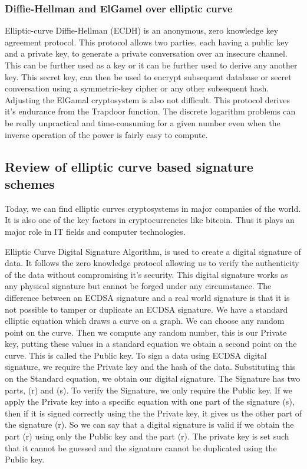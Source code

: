 \documentclass{article}
\begin{document}
\subsubsection{Diffie-Hellman and ElGamel over elliptic curve}
Elliptic-curve Diffie-Hellman (ECDH) is an anonymous, zero knowledge key agreement protocol. This protocol allows two parties, each having a public key and a private key, to generate a private conversation over an insecure channel. This can be further used as a key or it can be further used to derive any another key. This secret key, can then be used to encrypt subsequent database or secret conversation using a symmetric-key cipher or any other subsequent hash.\\
Adjusting the ElGamal cryptosystem is also not difficult. This protocol derives it's endurance from the Trapdoor function. The discrete logarithm problems can be really unpractical and time-consuming for a given number even when the inverse operation of the power is fairly easy to compute.
\subsection{Review of elliptic curve based signature schemes}
Today, we can find elliptic curves cryptosystems in major companies of the world. It is also one of the key factors in cryptocurrencies like bitcoin. Thus it plays an major role in IT fields and computer technologies. 


Elliptic Curve Digital Signature Algorithm, is used to create a digital signature of data. It follows the zero knowledge protocol allowing us to verify the authenticity of the data without compromising it's security.
 This digital signature works as any physical signature but cannot  be forged under any circumstance. The difference between an ECDSA signature and a real world signature is that it is not possible to tamper or duplicate an ECDSA signature.
 We have a standard elliptic equation which draws a curve on a graph. We can choose any random point on the curve. Then we compute any random number, this is our Private key, putting these values in a standard equation we obtain a second point on the curve. This is called the Public key.
To sign a data using ECDSA digital signature, we require the Private key and the hash of the data. Substituting this on the Standard equation, we obtain our digital signature. 
The Signature has two parts, (r) and (s). To verify the Signature, we only require the Public key. If we apply the Private key into a specific equation with one part of the signature (s), then if it is signed correctly using the the Private key, it gives us the other part of the signature (r). 
So we can say that a digital signature is valid if we obtain the part (r) using only the Public key and the part (r). The private key is set such that it cannot be guessed and the signature cannot be duplicated using the Public key.
\end{document}
